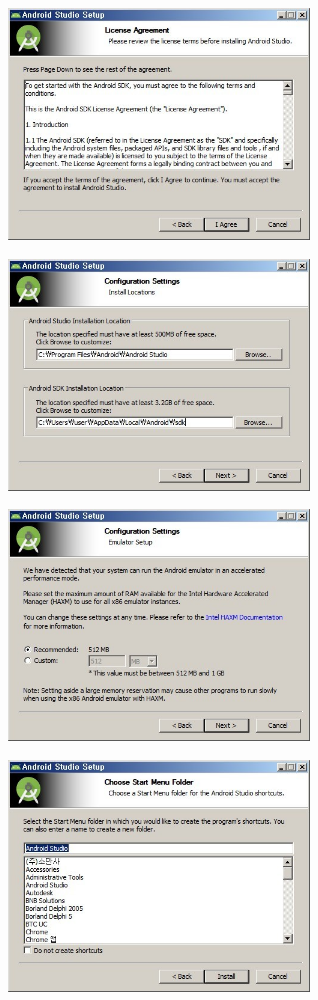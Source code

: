 \documentclass[12pt]{article}
\begin{document}
\begin{center}
\includegraphics[width=80mm,scale=1.3]{android4}
\end{center}

\begin{center}
\includegraphics[width=80mm,scale=1.3]{android5}
\end{center}

\begin{center}
\includegraphics[width=80mm,scale=1.3]{android6}
\end{center}

\begin{center}
\includegraphics[width=80mm,scale=1.3]{android7}
\end{center}
\end{document}

